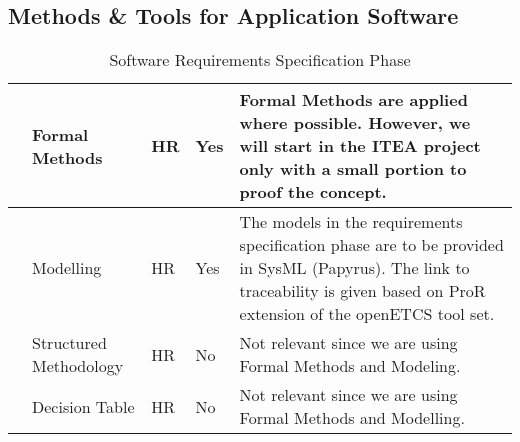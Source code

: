 \documentclass{template/openetcs_article}
\begin{document}
\newpage
\begin{appendices}
\section{Methods \& Tools for Application Software}
\label{ref:MethodS}



\begin{table}[H]


\begin{supertabular}[H]{|p{1cm}|p{5cm}|p{1cm}|p{3cm}|p{5cm}|}
\hline
{} &
Formal Methods &
\centering
HR &
\centering
Yes &
Formal Methods are applied where possible. However, we will start in the ITEA project only with a small portion to proof the concept. \\\hline
{} &
Modelling &
\centering
HR &
\centering
Yes &
The models in the requirements specification phase are to be provided in SysML (Papyrus). The link to traceability is given based on ProR extension of the openETCS tool set.
\\\hline
{} &
Structured Methodology &
\centering
HR &
\centering
No &
Not relevant since we are using Formal Methods and Modeling.
\\\hline
{} &
Decision Table &
\centering
HR &
\centering
No &
Not relevant since we are using Formal Methods and Modelling.
\\\hline
\end{supertabular}
\caption{Software Requirements Specification Phase}
\end{table}


\end{appendices}
\end{document}
